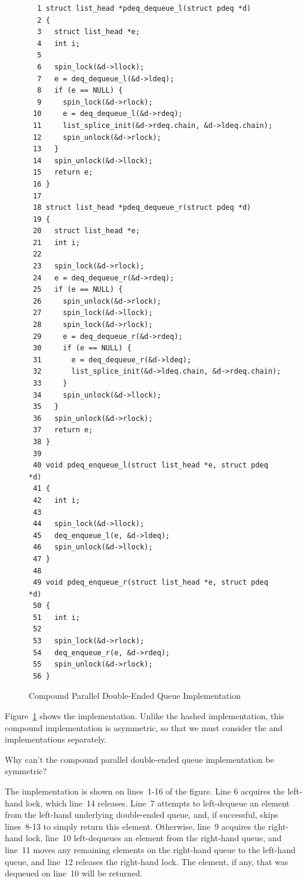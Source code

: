 \begin{figure}[bp]
{ \scriptsize
\begin{verbatim}
  1 struct list_head *pdeq_dequeue_l(struct pdeq *d)
  2 {
  3   struct list_head *e;
  4   int i;
  5
  6   spin_lock(&d->llock);
  7   e = deq_dequeue_l(&d->ldeq);
  8   if (e == NULL) {
  9     spin_lock(&d->rlock);
 10     e = deq_dequeue_l(&d->rdeq);
 11     list_splice_init(&d->rdeq.chain, &d->ldeq.chain);
 12     spin_unlock(&d->rlock);
 13   }
 14   spin_unlock(&d->llock);
 15   return e;
 16 }
 17
 18 struct list_head *pdeq_dequeue_r(struct pdeq *d)
 19 {
 20   struct list_head *e;
 21   int i;
 22
 23   spin_lock(&d->rlock);
 24   e = deq_dequeue_r(&d->rdeq);
 25   if (e == NULL) {
 26     spin_unlock(&d->rlock);
 27     spin_lock(&d->llock);
 28     spin_lock(&d->rlock);
 29     e = deq_dequeue_r(&d->rdeq);
 30     if (e == NULL) {
 31       e = deq_dequeue_r(&d->ldeq);
 32       list_splice_init(&d->ldeq.chain, &d->rdeq.chain);
 33     }
 34     spin_unlock(&d->llock);
 35   }
 36   spin_unlock(&d->rlock);
 37   return e;
 38 }
 39
 40 void pdeq_enqueue_l(struct list_head *e, struct pdeq *d)
 41 {
 42   int i;
 43
 44   spin_lock(&d->llock);
 45   deq_enqueue_l(e, &d->ldeq);
 46   spin_unlock(&d->llock);
 47 }
 48
 49 void pdeq_enqueue_r(struct list_head *e, struct pdeq *d)
 50 {
 51   int i;
 52
 53   spin_lock(&d->rlock);
 54   deq_enqueue_r(e, &d->rdeq);
 55   spin_unlock(&d->rlock);
 56 }
\end{verbatim}
}
\caption{Compound Parallel Double-Ended Queue Implementation}
\label{fig:SMPdesign:Compound Parallel Double-Ended Queue Implementation}
\end{figure}

Figure~\ref{fig:SMPdesign:Compound Parallel Double-Ended Queue Implementation}
shows the implementation.
Unlike the hashed implementation, this compound implementation is
asymmetric, so that we must consider the 
and  implementations separately.

\QuickQuiz{}
	Why can't the compound parallel double-ended queue
	implementation be symmetric?
 \QuickQuizEnd

The  implementation is shown on lines~1-16
of the figure.
Line 6 acquires the left-hand lock, which line~14 releases.
Line~7 attempts to left-dequeue an element from the left-hand underlying
double-ended queue, and, if successful, skips lines~8-13 to simply
return this element.
Otherwise, line~9 acquires the right-hand lock, line~10
left-dequeues an element from the right-hand queue,
and line~11 moves any remaining elements on the right-hand
queue to the left-hand queue, and line~12 releases the right-hand
lock.
The element, if any, that was dequeued on line~10 will be returned.


